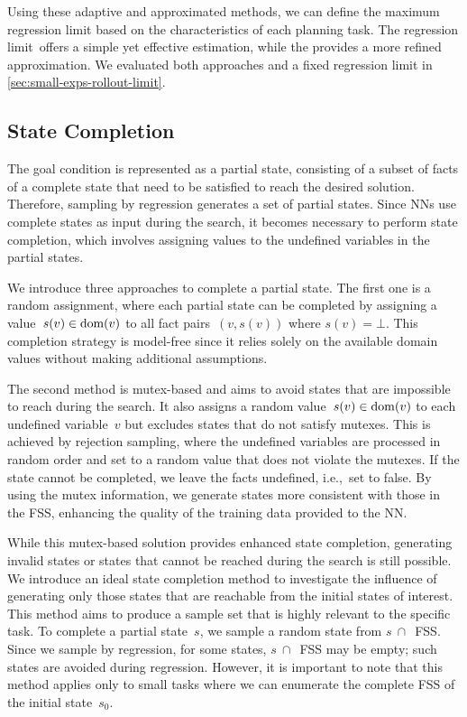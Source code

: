 Using these adaptive and approximated methods, we can define the maximum regression limit based on the characteristics of each planning task. The regression limit~\facts offers a simple yet effective estimation, while the \meanfx provides a more refined approximation. We evaluated both approaches and a fixed regression limit in \cref{sec:small-exps-rollout-limit}.

\subsection{State Completion}
\label{sec:state-completion}

The goal condition is represented as a partial state, consisting of a subset of facts of a complete state that need to be satisfied to reach the desired solution. Therefore, sampling by regression generates a set of partial states. Since NNs use complete states as input during the search, it becomes necessary to perform state completion, which involves assigning values to the undefined variables in the partial states.

We introduce three approaches to complete a partial state. The first one is a random assignment, where each partial state can be completed by assigning a value~$s(v) \in \operatorname{dom}(v)$ to all fact pairs~$(v,s(v))$ where $s(v)=\bot$. This completion strategy is model-free since it relies solely on the available domain values without making additional assumptions.

The second method is mutex-based and aims to avoid states that are impossible to reach during the search. It also assigns a random value~$s(v) \in \operatorname{dom}(v)$ to each undefined variable~$v$ but excludes states that do not satisfy mutexes. This is achieved by rejection sampling, where the undefined variables are processed in random order and set to a random value that does not violate the mutexes. If the state cannot be completed, we leave the facts undefined, i.e.,~set to false. By using the mutex information, we generate states more consistent with those in the FSS, enhancing the quality of the training data provided to the NN.

While this mutex-based solution provides enhanced state completion, generating invalid states or states that cannot be reached during the search is still possible. We introduce an ideal state completion method to investigate the influence of generating only those states that are reachable from the initial states of interest. This method aims to produce a sample set that is highly relevant to the specific task. To complete a partial state~$s$, we sample a random state from $s~\cap$~FSS. Since we sample by regression, for some states, $s~\cap$~FSS may be empty; such states are avoided during regression. However, it is important to note that this method applies only to small tasks where we can enumerate the complete FSS of the initial state~$s_0$.

